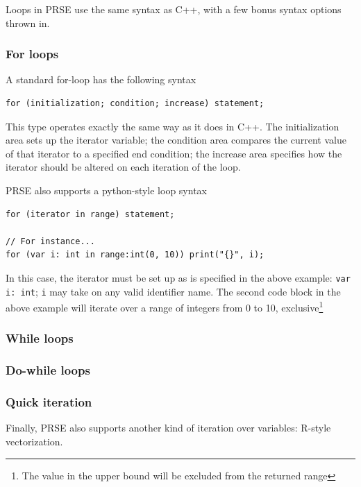 \documentclass[letterpaper, 12pt]{article}
\begin{document}
Loops in PRSE use the same syntax as C++, with a few bonus syntax options thrown in.

\subsubsection{For loops}

A standard for-loop has the following syntax

\begin{lstlisting}
for (initialization; condition; increase) statement;
\end{lstlisting}

This type operates exactly the same way as it does in C++. The initialization area sets up the
iterator variable; the condition area compares the current value of that iterator to a specified end
condition; the increase area specifies how the iterator should be altered on each iteration of the
loop.\linebreak

PRSE also supports a python-style loop syntax

\begin{lstlisting}
for (iterator in range) statement;

// For instance...
for (var i: int in range:int(0, 10)) print("{}", i);
\end{lstlisting}

In this case, the iterator must be set up as is specified in the above example: \texttt{var i: int};
\texttt{i} may take on any valid identifier name. The second code block in the above example will
iterate over a range of integers from 0 to 10, exclusive\footnote{The value in the upper bound will
be excluded from the returned range}

\subsubsection{While loops}



\subsubsection{Do-while loops}


\subsubsection{Quick iteration}

Finally, PRSE also supports another kind of iteration over variables: R-style vectorization.\linebreak
\end{document}
